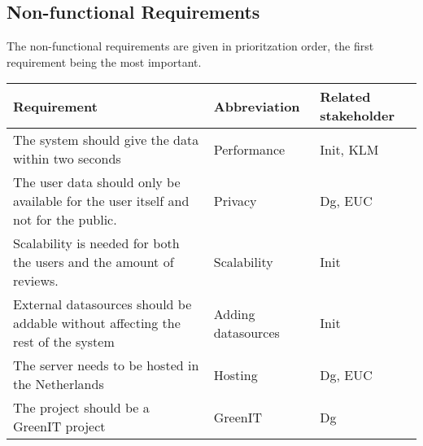 \subsection*{Non-functional Requirements}
The non-functional requirements are given in prioritzation order, the first requirement being the most important. 

\begin{longtable}{| p{10cm}| l | l |}
\hline
\textbf{Requirement} & \textbf{Abbreviation} & \textbf{Related stakeholder} \\ \hline
The system should give the data within two seconds & Performance & Init, KLM \\ \hline
The user data should only be available for the user itself and not for the public. & Privacy & Dg, EUC \\ \hline
Scalability is needed for both the users and the amount of reviews.& Scalability & Init \\ \hline
External datasources should be addable without affecting the rest of the system  & Adding datasources & Init \\ \hline
The server needs to be hosted in the Netherlands & Hosting & Dg, EUC \\ \hline
The project should be a GreenIT project & GreenIT & Dg\\ \hline
\end{longtable}

